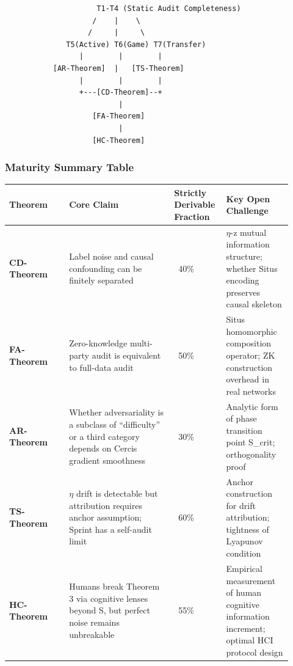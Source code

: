 \documentclass[
  12pt,
]{article}
\begin{document}
\begin{verbatim}
                     T1-T4 (Static Audit Completeness)
                    /    |    \
                   /     |     \
              T5(Active) T6(Game) T7(Transfer)
                 |        |        |
           [AR-Theorem]  |   [TS-Theorem]
                 |        |        |
                 +---[CD-Theorem]--+
                          |
                    [FA-Theorem]
                          |
                    [HC-Theorem]
\end{verbatim}

\subsubsection{Maturity Summary Table}\label{maturity-summary}

\begin{longtable}[]{@{}p{0.20\linewidth}p{0.35\linewidth}p{0.15\linewidth}p{0.22\linewidth}@{}}
\toprule\noalign{}
\begin{minipage}[b]{\linewidth}\raggedright
Theorem
\end{minipage} & \begin{minipage}[b]{\linewidth}\raggedright
Core Claim
\end{minipage} & \begin{minipage}[b]{\linewidth}\centering
Strictly Derivable Fraction
\end{minipage} & \begin{minipage}[b]{\linewidth}\raggedright
Key Open Challenge
\end{minipage} \\
\midrule\noalign{}
\endhead
\bottomrule\noalign{}
\endlastfoot
\textbf{CD-Theorem} & Label noise and causal confounding can be finitely separated & ~40\% & $\eta$-z mutual information structure; whether Situs encoding preserves causal skeleton \\
\textbf{FA-Theorem} & Zero-knowledge multi-party audit is equivalent to full-data audit & ~50\% & Situs homomorphic composition operator; ZK construction overhead in real networks \\
\textbf{AR-Theorem} & Whether adversariality is a subclass of ``difficulty'' or a third category depends on Cercis gradient smoothness & ~30\% & Analytic form of phase transition point S\_crit; orthogonality proof \\
\textbf{TS-Theorem} & $\eta$ drift is detectable but attribution requires anchor assumption; Sprint has a self-audit limit & ~60\% & Anchor construction for drift attribution; tightness of Lyapunov condition \\
\textbf{HC-Theorem} & Humans break Theorem 3 via cognitive lenses beyond S, but perfect noise remains unbreakable & ~55\% & Empirical measurement of human cognitive information increment; optimal HCI protocol design \\
\end{longtable}
\end{document}
